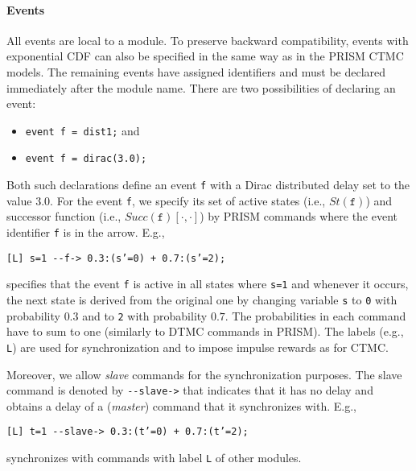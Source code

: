 \documentclass{article}
\renewcommand{\_}{\underline{~}}
\newcommand{\suc}{Succ}
\newcommand{\code}[1]{\texttt{#1}}
\begin{document}
\paragraph{Events}
All events are local to a module.
To preserve backward compatibility, events with exponential CDF can also be specified in the same way as in the PRISM CTMC models.
The remaining events have assigned identifiers and must be declared immediately after the module name.
There are two possibilities of declaring an event:
\begin{itemize}
	\item \code{event f = dist1;} and
	\item \code{event f = dirac(3.0);}
\end{itemize}
Both such declarations define an event \code{f} with a Dirac distributed delay set to the value $3.0$.
For the event \code{f}, we specify its set of active states (i.e., $St(\code{f})$) and successor function (i.e., $\suc(\code{f})[\cdot,\cdot]$) by PRISM commands where the event identifier \code{f} is in the arrow. 
E.g., 
\begin{center}
	\code{[L] s=1 {-}{-}f-> 0.3:(s'=0) + 0.7:(s'=2);}
\end{center}
specifies that the event \code{f} is active in all states where \code{s=1} and whenever it occurs, the next state is derived from the original one by changing variable \code{s} to \code{0} with probability $0.3$ and to \code{2} with probability $0.7$. 
The probabilities in each command have to sum to one (similarly to DTMC commands in PRISM). 
The labels (e.g., \code{L}) are used for synchronization and to impose impulse rewards as for CTMC.

Moreover, we allow \emph{slave} commands for the synchronization purposes. 
The slave command is denoted by \code{{-}{-}slave->} that indicates that it has no delay and obtains a delay of a (\emph{master}) command that it synchronizes with.
E.g., 
\begin{center}
	\code{[L] t=1 {-}{-}slave-> 0.3:(t'=0) + 0.7:(t'=2);}
\end{center}
synchronizes with commands with label \code{L} of other modules.
\end{document}
